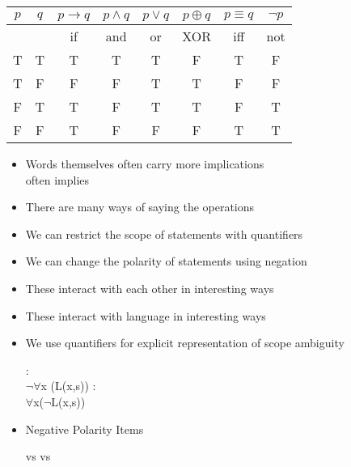 \documentclass[a4paper,landscape,headrule,footrule,xetex]{foils}
\begin{document}
\begin{center}
  \begin{tabular}{|c|c|c|c|c|c|c|c|}
    \hline
    $p$ & $q$ & $p \rightarrow q$ & $p \wedge q$ & $p \vee q$ 
    & $p \oplus q$ & $p \equiv q$ & $\neg p$\\
    \hline
    &   & if & and & or &  XOR & iff & not  \\
    \hline
    T & T & T & T & T & F & T & F \\ 
    T & F & F & F & T & T & F & F \\  
    F & T & T & F & T & T & F & T\\ 
    F & F & T & F & F & F & T & T\\ \hline
  \end{tabular}
  \begin{itemize}
  \item Words themselves often carry more implications
    \\  often implies 
  \item There are many ways of saying the operations
  \end{itemize}
\end{center}



\begin{itemize} \addtolength{\itemsep}{-1em} 
\item We can restrict the scope of statements with quantifiers
\item We can change the polarity of statements using negation
\item These interact with each other in interesting ways
\item These interact with language in interesting ways
\item We use quantifiers for explicit representation of scope ambiguity
  \begin{exe}
    \ex {}
    \begin{xlist}
          \ex {}:  
          \\ $\neg\forall$x (L(x,s))
          \ex {}: 
          \\ $\forall$x($\neg$L(x,s))
    \end{xlist}
  \end{exe}
\item Negative Polarity Items
 \begin{exe}
   \ex {} vs 
\ex {} vs
 \end{exe}
 
\end{itemize}
\end{document}
